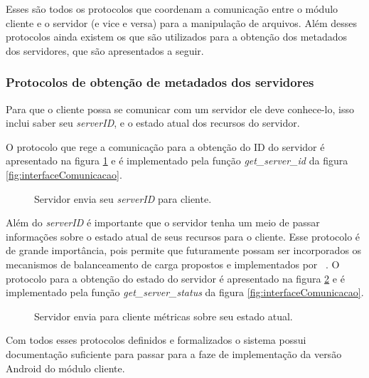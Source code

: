         
        Esses são todos os protocolos que coordenam a comunicação entre o módulo cliente e o servidor (e vice e versa) para a manipulação de arquivos. Além desses protocolos ainda existem os que são utilizados para a obtenção dos metadados dos servidores, que são apresentados a seguir.
        
        
        \subsubsection{Protocolos de obtenção de metadados dos servidores}
        
        Para que o cliente possa se comunicar com um servidor ele deve conhece-lo, isso inclui saber seu \textit{serverID}, e o estado atual dos recursos do servidor.
        
        O protocolo que rege a comunicação para a obtenção do ID do servidor é apresentado na figura \ref{fig:protGetServerID} e é implementado pela função \textit{get\_server\_id} da figura \ref{fig:interfaceComunicacao}.

        \begin{figure}[!ht]
        \caption{Servidor envia seu \textit{serverID} para cliente.}
        \label{fig:protGetServerID}
        \end{figure}
    
        Além do \textit{serverID} é importante que o servidor tenha um meio de passar informações sobre o estado atual de seus recursos para o cliente. Esse protocolo é de grande importância, pois permite que futuramente possam ser incorporados  os mecanismos de balanceamento de carga propostos e implementados por ~\cite{danilo}.
        O protocolo para a obtenção do estado do servidor é apresentado na figura \ref{fig:protServerGetStatus} e é implementado pela função \textit{get\_server\_status} da figura \ref{fig:interfaceComunicacao}.
        
         \begin{figure}[!ht]
         \caption{Servidor envia para cliente métricas sobre seu estado atual.}
         \label{fig:protServerGetStatus}
         \end{figure}
        
        Com todos esses protocolos definidos e formalizados o sistema possui documentação suficiente para passar para a faze de implementação da versão Android do módulo cliente.
        
